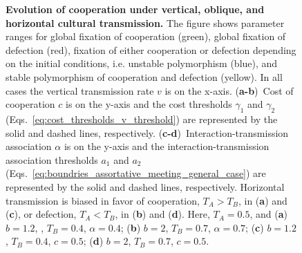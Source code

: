 \documentclass[12pt]{extarticle}
\begin{document}
{\begin{figure}[p]
    \caption{\textbf{Evolution of cooperation under vertical, oblique, and horizontal cultural transmission.} 
    The figure shows parameter ranges for global fixation of cooperation (green), global fixation of defection (red), fixation of either cooperation or defection depending on the initial conditions, i.e. unstable polymorphism (blue), and stable polymorphism of cooperation and defection (yellow).
	In all cases the vertical transmission rate $v$ is on the x-axis.
	(\textbf{a-b})~Cost of cooperation $c$ is on the y-axis and the cost thresholds $\gamma_1$ and $\gamma_2$ (Eqs.~\ref{eq:cost_thresholds_v_threshold}) are represented by the solid and dashed lines, respectively. 
    (\textbf{c-d})~Interaction-transmission association $\alpha$ is on the y-axis and the interaction-transmission association thresholds $a_1$ and $a_2$ (Eqs.~\ref{eq:boundries_assortative_meeting_general_case}) are represented by the solid and dashed lines, respectively. 
    Horizontal transmission is biased in favor of cooperation, $T_A>T_B$, in (\textbf{a}) and (\textbf{c}), or defection, $T_A<T_B$, in (\textbf{b}) and (\textbf{d}).    
    Here, $T_A = 0.5$, and
    (\textbf{a}) $b=1.2$, , $T_B = 0.4$, $\alpha = 0.4$;
    (\textbf{b}) $b=2$, $T_B = 0.7$, $\alpha = 0.7$;
    (\textbf{c}) $b=1.2$, $T_B = 0.4$, $c=0.5$;
    (\textbf{d}) $b=2$, $T_B = 0.7$, $c=0.5$.
    }
    \label{fig:equilibria}
\end{figure}




}
\end{document}
